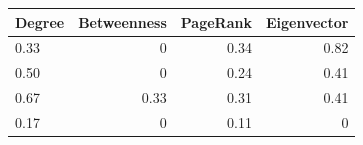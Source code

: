 

\begin{tabular}{@{}lrrr@{}}
\toprule
Degree & Betweenness & PageRank & Eigenvector \\
\midrule
0.33 & 0 & 0.34 & 0.82 \\
0.50 & 0 & 0.24 & 0.41 \\
0.67 & 0.33 & 0.31 & 0.41 \\
0.17 & 0 & 0.11 & 0 \\
\bottomrule
\end{tabular}